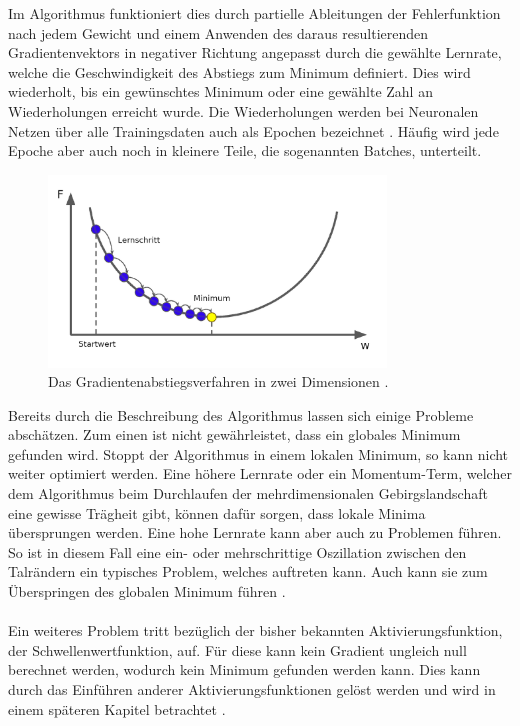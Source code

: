 \documentclass[11pt,bibliography=totocnumbered]{scrartcl}
\begin{document}
Im Algorithmus funktioniert dies durch partielle Ableitungen der Fehlerfunktion nach jedem Gewicht und einem Anwenden des daraus resultierenden Gradientenvektors in negativer Richtung angepasst durch die gewählte Lernrate, welche die Geschwindigkeit des Abstiegs zum Minimum definiert. Dies wird wiederholt, bis ein gewünschtes Minimum oder eine gewählte Zahl an Wiederholungen erreicht wurde. Die Wiederholungen werden bei Neuronalen Netzen über alle Trainingsdaten auch als Epochen bezeichnet \cite[S.29-30]{BA}\cite[S.41]{NN}\cite[S.31]{DEEP_LEARNING}. Häufig wird jede Epoche aber auch noch in kleinere Teile, die sogenannten Batches, unterteilt.
\begin{figure}[H]
	\centering
	\includegraphics[width=0.8\textwidth]{2DGradient}
	\vspace*{-5mm}
	\caption[Gradientenabstiegsverfahren in zwei Dimensionen]{Das Gradientenabstiegsverfahren in zwei Dimensionen \cite[S.113]{MACHINE_LEARNING}.}
	\label{fig:2DGrad}
\end{figure}
\vspace*{-5mm}
Bereits durch die Beschreibung des Algorithmus lassen sich einige Probleme abschätzen. Zum einen ist nicht gewährleistet, dass ein globales Minimum gefunden wird. Stoppt der Algorithmus in einem lokalen Minimum, so kann nicht weiter optimiert werden. Eine höhere Lernrate oder ein Momentum-Term, welcher dem Algorithmus beim Durchlaufen der mehrdimensionalen Gebirgslandschaft eine gewisse Trägheit gibt, können dafür sorgen, dass lokale Minima übersprungen werden. Eine hohe Lernrate kann aber auch zu Problemen führen. So ist in diesem Fall eine ein- oder mehrschrittige Oszillation zwischen den Talrändern ein typisches Problem, welches auftreten kann. Auch kann sie zum Überspringen des globalen Minimum führen \cite[S.30]{BA}\cite[S.46-47]{NN}.
\\\\
Ein weiteres Problem tritt bezüglich der bisher bekannten Aktivierungsfunktion, der Schwellenwertfunktion, auf. Für diese kann kein Gradient ungleich null berechnet werden, wodurch kein Minimum gefunden werden kann. Dies kann durch das Einführen anderer Aktivierungsfunktionen gelöst werden und wird in einem späteren Kapitel betrachtet \cite[S.31-32]{BA}\cite[S.262]{MACHINE_LEARNING}.
\end{document}
